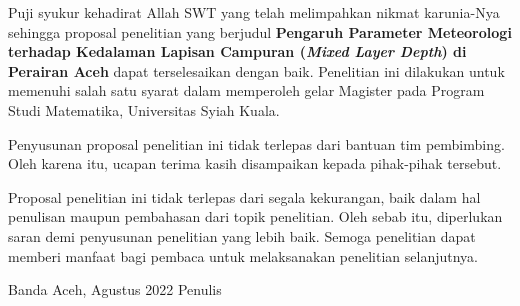 \begin{spacing}{1.5}
	\pagestyle{empty}
	
	\vskip 1cm
	\par Puji syukur kehadirat Allah SWT yang telah melimpahkan nikmat karunia-Nya sehingga proposal penelitian yang berjudul \textbf{Pengaruh Parameter Meteorologi terhadap Kedalaman Lapisan Campuran (\textit{Mixed Layer Depth}) di Perairan Aceh} dapat terselesaikan dengan baik. Penelitian ini dilakukan untuk memenuhi salah satu syarat dalam memperoleh gelar Magister pada Program Studi Matematika, Universitas Syiah Kuala.
	\par Penyusunan proposal penelitian ini tidak terlepas dari bantuan tim pembimbing. Oleh karena itu, ucapan terima  kasih disampaikan kepada pihak-pihak tersebut.
	\par Proposal penelitian ini tidak terlepas dari segala kekurangan, baik dalam hal penulisan maupun pembahasan dari topik penelitian. Oleh sebab itu, diperlukan saran demi penyusunan penelitian yang lebih baik. Semoga penelitian dapat memberi manfaat bagi pembaca untuk melaksanakan penelitian selanjutnya.
	\vskip 1cm  
	\begin{flushright}
		Banda Aceh, Agustus 2022
		\vskip 2cm
		Penulis	
	\end{flushright}
\end{spacing}
\pagestyle{empty}